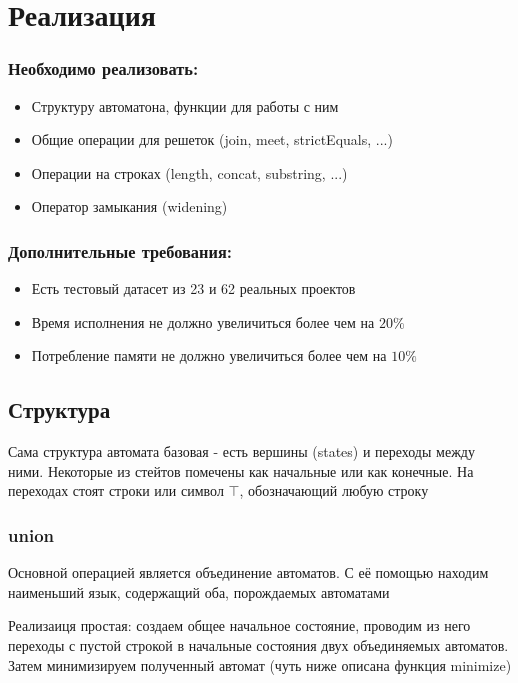 \section{Реализация}

\subsubsection*{Необходимо реализовать:}
\begin{itemize}
    \item Структуру автоматона, функции для работы с ним
    \item Общие операции для решеток (join, meet, strictEquals, ...)
    \item Операции на строках (length, concat, substring, ...)
    \item Оператор замыкания (widening)
\end{itemize}

\subsubsection*{Дополнительные требования:}
\begin{itemize}
    \item Есть тестовый датасет из 23 и 62 реальных проектов
    \item Время исполнения не должно увеличиться более чем на $20\%$
    \item Потребление памяти не должно увеличиться более чем на $10\%$
\end{itemize}

\newpage
\subsection{Структура}
Сама структура автомата базовая - есть вершины (states) и переходы между ними. Некоторые из стейтов помечены как начальные или как конечные. На переходах стоят строки или символ $\top$, обозначающий любую строку

\subsubsection*{union}
Основной операцией является объединение автоматов. С её помощью находим наименьший язык, содержащий оба, порождаемых автоматами

Реализаиця простая: создаем общее начальное состояние, проводим из него переходы с пустой строкой в начальные состояния двух объединяемых автоматов. Затем минимизируем полученный автомат (чуть ниже описана функция minimize)

